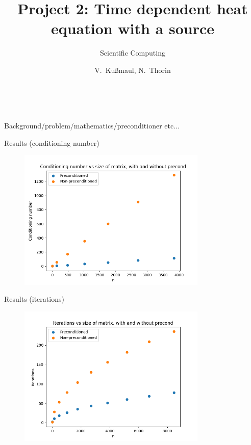 \documentclass[11pt,aspectratio=1610]{beamer}
\title{Project 2: Time dependent heat equation with a source}
\subtitle{\small{Scientific Computing}
}
\author{V.~Ku{\ss}maul, N.~Thorin}
\date{\, }
\begin{document}

\begin{frame}
	\titlepage
\end{frame}









\begin{frame}{Background/problem/mathematics/preconditioner etc...}
\end{frame} 


\begin{frame}{Results (conditioning number)}
	\begin{figure}
		\includegraphics[width=0.8\textwidth]{../images/conditioning_test.png}
	\end{figure}

\end{frame} 


\begin{frame}{Results (iterations)}
\begin{figure}
	\includegraphics[width=0.8\textwidth]{../images/iterations_test.png}
\end{figure}
\end{frame}
\end{document}
